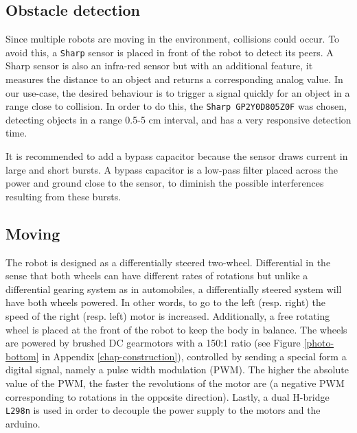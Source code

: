 \documentclass[12pt]{report}
\begin{document}
\subsection*{Obstacle detection}
Since multiple robots are moving in the environment, collisions could occur. To avoid this, a \texttt{Sharp} sensor is placed in front of the robot to detect its peers. A Sharp sensor is also an infra-red sensor but with an additional feature, it measures the distance to an object and returns a corresponding analog value. In our use-case, the desired behaviour is to trigger a signal quickly for an object in a range close to collision. In order to do this, the \texttt{Sharp GP2Y0D805Z0F} was chosen, detecting objects in a range 0.5-5 cm interval, and has a very responsive detection time.

It is recommended to add a bypass capacitor because the sensor draws current in large and short bursts. A bypass capacitor is a low-pass filter placed across the power and ground close to the sensor, to diminish the possible interferences resulting from these bursts.

\subsection*{Moving}
The robot is designed as a differentially steered two-wheel. Differential in the sense that both wheels can have different rates of rotations but unlike a differential gearing system as in automobiles, a differentially steered system will have both wheels powered. In other words, to go to the left (resp. right) the speed of the right (resp. left) motor is increased. Additionally, a free rotating wheel is placed at the front of the robot to keep the body in balance. The wheels are powered by brushed DC gearmotors with a 150:1 ratio (see Figure \ref{photo-bottom} in Appendix \ref{chap-construction}), controlled by sending a special form a digital signal, namely a pulse width modulation (PWM). The higher the absolute value of the PWM, the faster the revolutions of the motor are (a negative PWM corresponding to rotations in the opposite direction). Lastly, a dual H-bridge \texttt{L298n} is used in order to decouple the power supply to the motors and the arduino. 
\end{document}
